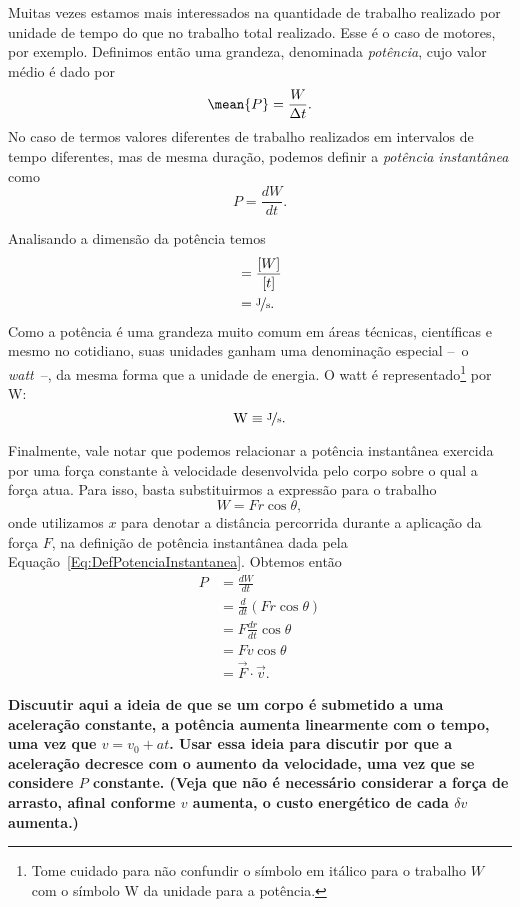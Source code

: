 Muitas vezes estamos mais interessados na quantidade de trabalho realizado por unidade de tempo do que no trabalho total realizado. Esse é o caso de motores, por exemplo. Definimos então uma grandeza, denominada \emph{potência}, cujo valor médio é dado por
\begin{equation}
  \mean{P} = \frac{W}{\Delta t}.
\end{equation}
%
No caso de termos valores diferentes de trabalho realizados em intervalos de tempo diferentes, mas de mesma duração, podemos definir a \emph{potência instantânea} como
\begin{equation}\label{Eq:DefPotenciaInstantanea}
  P = \frac{dW}{dt}.
\end{equation}

Analisando a dimensão da potência temos
\begin{align}
  [P] &= \frac{[W]}{[t]} \\
  &= \nicefrac{\rm{J}}{\rm{s}}.
\end{align}
%
Como a potência é uma grandeza muito comum em áreas técnicas, científicas e mesmo no cotidiano, suas unidades ganham uma denominação especial --~o \emph{watt}~--, da mesma forma que a unidade de energia. O watt é representado\footnote{Tome cuidado para não confundir o símbolo em itálico para o trabalho $W$ com o símbolo W da unidade para a potência.} por W:
\begin{equation}
  \rm{W} \equiv \nicefrac{\rm{J}}{\rm{s}}.
\end{equation}

Finalmente, vale notar que podemos relacionar a potência instantânea exercida por uma força constante à velocidade desenvolvida pelo corpo sobre o qual a força atua. Para isso, basta substituirmos a expressão para o trabalho
\begin{equation}
  W = F r \cos \theta,
\end{equation}
%
onde utilizamos $x$ para denotar a distância percorrida durante a aplicação da força $F$, na definição de potência instantânea dada pela Equação~\ref{Eq:DefPotenciaInstantanea}. Obtemos então
\begin{align}
  P &= \frac{dW}{dt} \\
  &= \frac{d}{dt}(Fr\cos\theta) \\
  &= F\frac{dr}{dt} \cos\theta\\
  &= F v \cos\theta \\
  &= \vec{F}\cdot\vec{v}.
\end{align}

\textbf{Discuutir aqui a ideia de que se um corpo é submetido a uma aceleração constante, a potência aumenta linearmente com o tempo, uma vez que $v = v_0 + at$. Usar essa ideia para discutir por que a aceleração decresce com o aumento da velocidade, uma vez que se considere $P$ constante. (Veja que não é necessário considerar a força de arrasto, afinal conforme $v$ aumenta, o custo energético de cada $\delta v$ aumenta.)}

